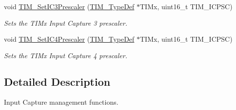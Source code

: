\begin{DoxyCompactItemize}
void \hyperlink{group___t_i_m___group3_ga76f906383b8132ebe00dffadb70cf7f9}{T\+I\+M\+\_\+\+Set\+I\+C3\+Prescaler} (\hyperlink{struct_t_i_m___type_def}{T\+I\+M\+\_\+\+Type\+Def} $\ast$T\+I\+Mx, uint16\+\_\+t T\+I\+M\+\_\+\+I\+C\+P\+SC)
\begin{DoxyCompactList}\small\item\em Sets the T\+I\+Mx Input Capture 3 prescaler. \end{DoxyCompactList}\item 
void \hyperlink{group___t_i_m___group3_ga0f2c784271356d6b64b8c0da64dbdbc2}{T\+I\+M\+\_\+\+Set\+I\+C4\+Prescaler} (\hyperlink{struct_t_i_m___type_def}{T\+I\+M\+\_\+\+Type\+Def} $\ast$T\+I\+Mx, uint16\+\_\+t T\+I\+M\+\_\+\+I\+C\+P\+SC)
\begin{DoxyCompactList}\small\item\em Sets the T\+I\+Mx Input Capture 4 prescaler. \end{DoxyCompactList}\end{DoxyCompactItemize}


\subsection{Detailed Description}
Input Capture management functions. 

